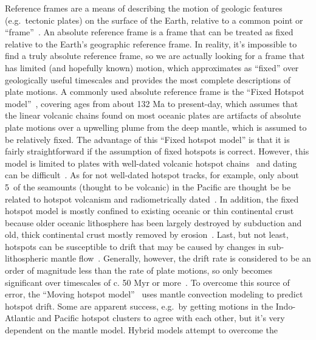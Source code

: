 Reference frames are a means of describing the motion of geologic features
(e.g.\ tectonic plates) on the surface of the Earth, relative to a common point
or ``frame''~\citep{Sh12}. An absolute reference frame is a frame that can be
treated as fixed relative to the Earth's geographic reference frame. In reality,
it's impossible to find a truly absolute reference frame, so we are actually
looking for a frame that has limited (and hopefully known) motion, which
approximates as ``fixed'' over geologically useful timescales and provides the
most complete descriptions of plate motions. A commonly used absolute reference
frame is the ``Fixed Hotspot model''~\citep{M93,M99}, covering ages from about
132 Ma to present-day, which assumes that the linear volcanic chains found on
most oceanic plates are artifacts of absolute plate motions over a upwelling
plume from the deep mantle, which is assumed to be relatively fixed. The
advantage of this ``Fixed hotspot model'' is that it is fairly straightforward
if the assumption of fixed hotspots is correct. However, this model is limited
to plates with well-dated volcanic hotspot chains~\citep[e.g.\ the Ninetyeast
Ridge on the Indian Ocean floor and the Walvis Ridge in the southern Atlantic
Ocean; see][]{O05} and dating can be difficult~\citep[e.g.\ diffuse volcanic
centers possibly related to large diameter plume conduits could cause the
existence of time reversals; see][]{O05}. As for not well-dated hotspot tracks,
for example, only about 5\textperthousand\ of the seamounts (thought to be
volcanic) in the Pacific are thought be be related to hotspot volcanism and
radiometrically dated~\citep[39 per cent of these ages are less than 10 Ma;
see][]{H07}. In addition, the fixed hotspot model is mostly confined to existing
oceanic or thin continental crust because older oceanic lithosphere has been
largely destroyed by subduction and old, thick continental crust mostly removed
by erosion~\citep{C13}. Last, but not least, hotspots can be susceptible to
drift that may be caused by changes in sub-lithospheric mantle flow~\citep{T09}.
Generally, however, the drift rate is considered to be an order of magnitude
less than the rate of plate motions, so only becomes significant over timescales
of c. 50 Myr or more~\citep{O05,T07}. To overcome this source of error, the
``Moving hotspot model''~\citep{O05} uses mantle convection modeling to predict
hotspot drift. Some are apparent success, e.g.\ by getting motions in the
Indo-Atlantic and Pacific hotspot clusters to agree with each other, but it's
very dependent on the mantle model. Hybrid models attempt to overcome the
